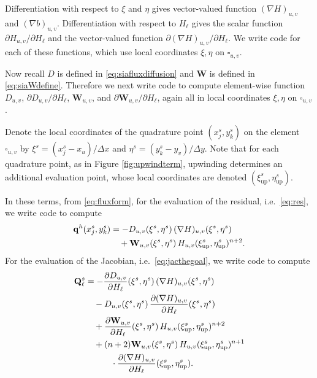 \documentclass[twocolumn,letterpaper]{igs}
\newcommand\bq{\mathbf{q}}
\newcommand\bQ{\mathbf{Q}}
\newcommand\bW{\mathbf{W}}
\newcommand{\grad}{\nabla}
\begin{document}
Differentiation with respect to $\xi$ and $\eta$ gives vector-valued function $(\grad H)_{u,v}$ and $(\grad b)_{u,v}$.  Differentiation with respect to $H_\ell$ gives the scalar function $\partial H_{u,v}/\partial H_\ell$ and the vector-valued function $\partial (\grad H)_{u,v}/\partial H_\ell$.  We write code for each of these functions, which use local coordinates $\xi,\eta$ on $\square_{u,v}$.

Now recall $D$ is defined in \eqref{eq:siafluxdiffusion} and $\bW$ is defined in \eqref{eq:siaWdefine}.  Therefore we next write code to compute element-wise function $D_{u,v}$, $\partial D_{u,v}/\partial H_\ell$, $\bW_{u,v}$, and $\partial \bW_{u,v}/\partial H_\ell$, again all in local coordinates $\xi,\eta$ on $\square_{u,v}$.

\newcommand{\uppoint}{(\xi_{\text{up}}^s,\eta_{\text{up}}^s)}
Denote the local coordinates of the quadrature point $(x_j^s,y_k^s)$ on the element $\square_{u,v}$ by $\xi^s = (x_j^s-x_u)/\Delta x$ and $\eta^s = (y_k^s-y_v)/\Delta y$.  Note that for each quadrature point, as in Figure \ref{fig:upwindterm}, upwinding determines an additional evaluation point, whose local coordinates are denoted $\uppoint$.

In these terms, from \eqref{eq:fluxform}, for the evaluation of the residual, i.e.~\eqref{eq:res}, we write code to compute
\begin{align}
\bq^h(x_j^s,y_k^s) &= - D_{u,v}(\xi^s,\eta^s)\, (\grad H)_{u,v}(\xi^s,\eta^s) \label{eq:resfinalformula} \\
   &\quad + \bW_{u,v}(\xi^s,\eta^s) \, H_{u,v}\uppoint^{n+2}. \notag
\end{align}
For the evaluation of the Jacobian, i.e.~\eqref{eq:jacthegoal}, we write code to compute
\begin{align}
\bQ_\ell^s &= - \frac{\partial D_{u,v}}{\partial H_\ell}(\xi^s,\eta^s)\, (\grad H)_{u,v}(\xi^s,\eta^s) \label{eq:jacfinalformula} \\
   &\quad - D_{u,v}(\xi^s,\eta^s)\, \frac{\partial (\grad H)_{u,v}}{\partial H_\ell}(\xi^s,\eta^s) \notag \\
   &\quad + \frac{\partial \bW_{u,v}}{\partial H_\ell}(\xi^s,\eta^s) \, H_{u,v}\uppoint^{n+2} \notag \\
   &\quad + (n+2) \bW_{u,v}(\xi^s,\eta^s)\, H_{u,v}\uppoint^{n+1} \notag \\
   &\qquad\quad \cdot \frac{\partial (\grad H)_{u,v}}{\partial H_\ell}\uppoint. \notag
\end{align}
\end{document}
